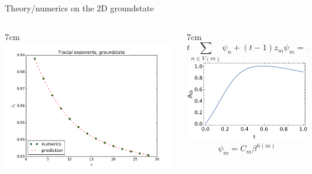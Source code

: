 \documentclass[xcolor=x11names,compress,professionalfonts, aspectratio=169]{beamer}
\renewcommand{\(}{\begin{columns}}
\renewcommand{\)}{\end{columns}}
\newcommand{\<}[1]{\begin{column}{#1}}
\renewcommand{\>}{\end{column}}
\begin{document}
\begin{frame}{Theory/numerics on the 2D groundstate}
\begin{columns}
\<{7cm}
\centering
\includegraphics[scale=.4]{img/fractal_exponents_groundstate.png}
\>
\<{7cm}
\[
	t \sum_{n \in V(m)} \psi_n + (t-1)z_m \psi_m = E \psi_m
\]
\centering
\includegraphics[scale=.6]{img/beta_t.pdf}
\[
	\psi_m = C_m \beta^{h(m)}
\]
\>
\end{columns}
\end{frame}
\end{document}
